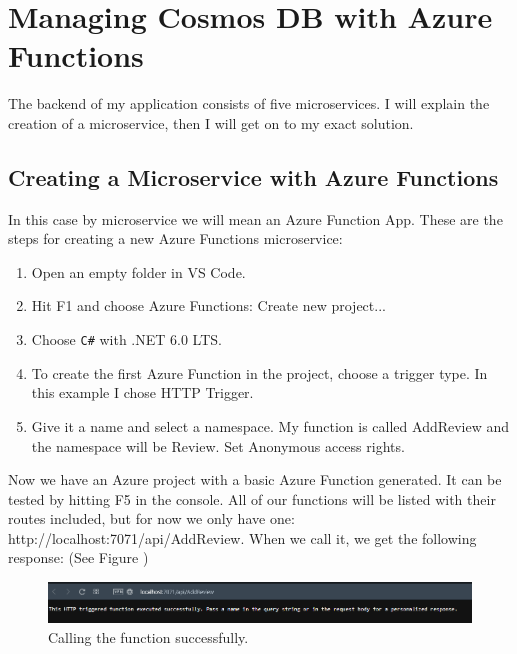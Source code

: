 \chapter{Managing Cosmos DB with Azure Functions}\label{Ch4}

The backend of my application consists of five microservices. I will explain the creation of a microservice, then I will get on to my exact solution.  
\section{Creating a Microservice with Azure Functions}
In this case by microservice we will mean an Azure Function App. 
These are the steps for creating a new Azure Functions microservice: \cite{VSCodeFunction}

\begin{enumerate}
	\item Open an empty folder in VS Code.
	\item Hit F1 and choose Azure Functions: Create new project...
	\item Choose \verb+C#+ with .NET 6.0 LTS.
	\item To create the first Azure Function in the project, choose a trigger type. In this example I chose HTTP Trigger.
	\item Give it a name and select a namespace. My function is called AddReview and the namespace will be Review. Set Anonymous access rights.
\end{enumerate}
	
Now we have an Azure project with a basic Azure Function generated. It can be tested by hitting F5 in the console. All of our functions will be listed with their routes included, but for now we only have one: http://localhost:7071/api/AddReview. When we call it, we get the following response: (See Figure )

\begin{figure}[!ht]
	\centering
	\includegraphics[width=150mm, keepaspectratio]{figures/4_response.png}
	\caption{Calling the function successfully.} 
	\label{fig:res}
\end{figure}

